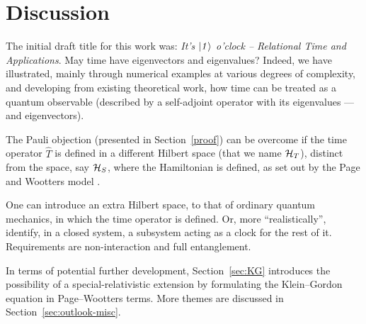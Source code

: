 \section{Discussion}

The initial draft title for this work was: 
\textit{It's $\it\ket{1}$ o'clock -- Relational Time and Applications}.
May time have eigenvectors and eigenvalues?
Indeed,
we have illustrated,
mainly through numerical examples
at various degrees of complexity,
and developing from existing theoretical work,
how time can be treated as a quantum observable
(described by a self-adjoint operator with its eigenvalues ---and eigenvectors).

The Pauli objection (presented in Section~\ref{proof})
can be overcome if the time operator $\hat{T}$
is defined in a different Hilbert space (that we name $\mathcal{H}_T$),
distinct from
the space, say $\mathcal{H}_S$, where the Hamiltonian is defined,
as set out by the Page and Wootters model
\parencite{PageWootters, Lloyd:Time, Marletto:Evolution, Maccone:QMOT, Maccone:Pauli}.

One can introduce an extra Hilbert space, to that of ordinary quantum mechanics,
in which the time operator is defined.
Or, more ``realistically'', identify, in a closed system, a subsystem
acting as a clock for the rest of it. Requirements are non-interaction and
full entanglement.

In terms of potential further development,
Section~\ref{sec:KG} introduces the possibility of a special-relativistic extension
by formulating the Klein--Gordon equation in Page--Wootters terms.
More themes are discussed in Section~\ref{sec:outlook-misc}.




